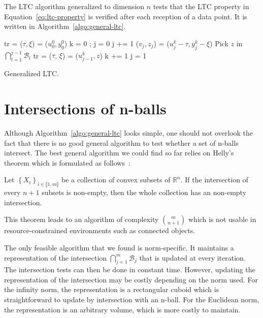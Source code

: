 The LTC algorithm generalized to dimension $n$ tests that the LTC  property in
Equation~\ref{eq:ltc-property} is verified after each reception of a data
point. It is written in Algorithm~\ref{algo:general-ltc}.
\begin{algorithm}
\begin{algorithmic}[1]
\Input
\EndInput
\Output
\EndOutput

\State tr = ($\tau, \xi$) = ($u^0_0, y^0_0$) 
\State k = 0 ; j = 0
    \State j += 1
    \State ($v_j, z_j$) = ($u_j^k - \tau, y_j^k - \xi$)
        \State Pick $z$ in $\bigcap_{l=1}^{j-1}{\mathcal{B}_l}$ 
        \State tr = ($\tau$, $\xi$) = ($u^k_{j-1}, z$)
        \State k += 1
        \State j = 1
    \EndIf
\EndWhile
\end{algorithmic}
\caption{Generalized LTC.}
\label{algo:general-ltc}
\end{algorithm}

\section{Intersections of n-balls}

Although Algorithm~\ref{algo:general-ltc} looks simple, one should not
overlook the fact that there is no good general algorithm to test
whether a set of n-balls intersect. The best general algorithm we could find
so far relies on Helly's theorem which is formulated as follows~\cite{helly1923mengen}:
\begin{theorem}
Let $\left\{ X_i \right\}_{i \in \llbracket 1, m \rrbracket}$ be a collection of
convex subsets of $\mathbb{R}^n$. If the intersection of every $n+1$ subsets is
non-empty, then the whole collection has an non-empty intersection.
\end{theorem}
\noindent This theorem leads to an algorithm of complexity ${\binom{m}{n+1}}$
which is not usable in resource-constrained environments such as connected
objects.

The only feasible algorithm that we found is norm-specific. It
maintains a representation of the intersection
$\bigcap_{j=1}^{m}{\mathcal{B}_j}$ that is updated at every iteration.
The intersection tests can then be done in constant time. However,
updating the representation of the intersection may be costly
depending on the norm used. For the infinity norm, the representation
is a rectangular cuboid which is straightforward to update by
intersection with an n-ball.
For the Euclidean norm, the representation is an arbitrary volume,
which is more costly to maintain.


